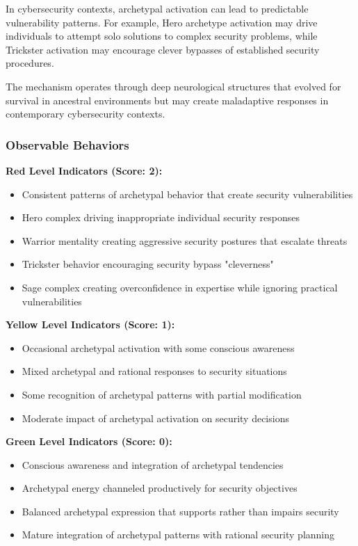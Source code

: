 \documentclass[11pt,a4paper]{article}
\begin{document}
In cybersecurity contexts, archetypal activation can lead to predictable vulnerability patterns. For example, Hero archetype activation may drive individuals to attempt solo solutions to complex security problems, while Trickster activation may encourage clever bypasses of established security procedures.

The mechanism operates through deep neurological structures that evolved for survival in ancestral environments but may create maladaptive responses in contemporary cybersecurity contexts\cite{stevens2015}.

\subsubsection{Observable Behaviors}

\textbf{Red Level Indicators (Score: 2):}
\begin{itemize}
\item Consistent patterns of archetypal behavior that create security vulnerabilities
\item Hero complex driving inappropriate individual security responses
\item Warrior mentality creating aggressive security postures that escalate threats
\item Trickster behavior encouraging security bypass "cleverness"
\item Sage complex creating overconfidence in expertise while ignoring practical vulnerabilities
\end{itemize}

\textbf{Yellow Level Indicators (Score: 1):}
\begin{itemize}
\item Occasional archetypal activation with some conscious awareness
\item Mixed archetypal and rational responses to security situations
\item Some recognition of archetypal patterns with partial modification
\item Moderate impact of archetypal activation on security decisions
\end{itemize}

\textbf{Green Level Indicators (Score: 0):}
\begin{itemize}
\item Conscious awareness and integration of archetypal tendencies
\item Archetypal energy channeled productively for security objectives
\item Balanced archetypal expression that supports rather than impairs security
\item Mature integration of archetypal patterns with rational security planning
\end{itemize}
\end{document}
